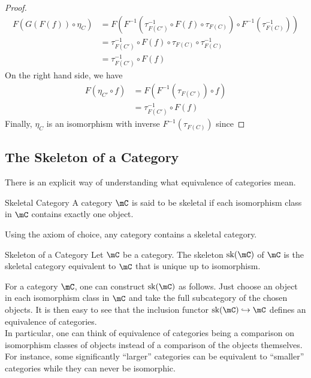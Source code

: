\documentclass[a4paper]{article}
\begin{document}
\begin{prp}{}{}
\begin{proof}
\begin{align*}
F(G(F(f))\circ\eta_C)&=F\left(F^{-1}\left(\tau_{F(C')}^{-1}\circ F(f)\circ\tau_{F(C)}\right)\circ F^{-1}\left(\tau_{F(C)}^{-1}\right)\right)\\
&=\tau_{F(C')}^{-1}\circ F(f)\circ\tau_{F(C)}\circ\tau_{F(C)}^{-1}\\
&=\tau_{F(C')}^{-1}\circ F(f)
\end{align*}
On the right hand side, we have
\begin{align*}
F(\eta_{C'}\circ f)&=F(F^{-1}(\tau_{F(C')})\circ f)\\
&=\tau_{F(C')}^{-1}\circ F(f)
\end{align*}
Finally, $\eta_C$ is an isomorphism with inverse $F^{-1}(\tau_{F(C)})$ since 
\end{proof}
\end{prp}

\subsection{The Skeleton of a Category}
There is an explicit way of understanding what equivalence of categories mean. 

\begin{defn}{Skeletal Category}{} A category $\mC$ is said to be skeletal if each isomorphism class in $\mC$ contains exactly one object. 
\end{defn}

Using the axiom of choice, any category contains a skeletal category. 

\begin{defn}{Skeleton of a Category}{} Let $\mC$ be a category. The skeleton $\text{sk}(\mC)$ of $\mC$ is the skeletal category equivalent to $\mC$ that is unique up to isomorphism. 
\end{defn}

For a category $\mC$, one can construct $\text{sk}(\mC)$ as follows. Just choose an object in each isomorphism class in $\mC$ and take the full subcategory of the chosen objects. It is then easy to see that the inclusion functor $\text{sk}(\mC)\hookrightarrow\mC$ defines an equivalence of categories. \\

In particular, one can think of equivalence of categories being a comparison on isomorphism classes of objects instead of a comparison of the objects themselves. For instance, some significantly ``larger'' categories can be equivalent to ``smaller'' categories while they can never be isomorphic. 
\end{document}
